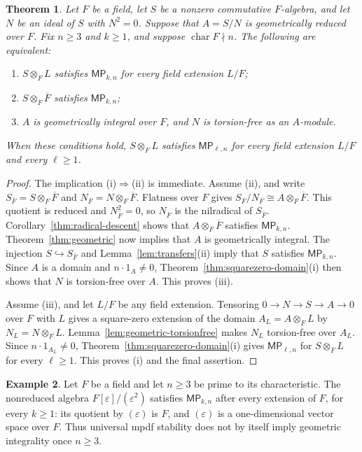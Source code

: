 \documentclass[11pt,a4paper]{amsart}
\newtheorem{theorem}{Theorem}[section]
\theoremstyle{definition}
\newtheorem{example}[theorem]{Example}
\theoremstyle{remark}
\newcommand{\MP}[2]{\mathsf{MP}_{#1,#2}}
\numberwithin{equation}{section}
\begin{document}
\begin{theorem}\label{thm:geometric-squarezero}
Let $F$ be a field, let $S$ be a nonzero commutative $F$-algebra, and
let $N$ be an ideal of $S$ with $N^2=0$. Suppose that $A=S/N$ is
geometrically reduced over $F$. Fix $n\ge3$ and $k\ge1$, and suppose
$\operatorname{char}F\nmid n$. The following are equivalent:
\begin{enumerate}
\item $S\otimes_F L$ satisfies $\MP{k}{n}$ for every field extension
$L/F$;
\item $S\otimes_F\overline F$ satisfies $\MP{k}{n}$;
\item $A$ is geometrically integral over $F$, and $N$ is torsion-free
as an $A$-module.
\end{enumerate}
When these conditions hold, $S\otimes_F L$ satisfies
$\MP{\ell}{n}$ for every field extension $L/F$ and every $\ell\ge1$.
\end{theorem}
\begin{proof}
The implication (i)$\Rightarrow$(ii) is immediate. Assume (ii), and
write $S_{\overline F}=S\otimes_F\overline F$ and
$N_{\overline F}=N\otimes_F\overline F$. Flatness over $F$ gives
$S_{\overline F}/N_{\overline F}\cong A\otimes_F\overline F$.
This quotient is reduced and $N_{\overline F}^2=0$, so
$N_{\overline F}$ is the nilradical of $S_{\overline F}$.
Corollary~\ref{thm:radical-descent} shows that
$A\otimes_F\overline F$ satisfies $\MP{k}{n}$.
Theorem~\ref{thm:geometric} now implies that $A$ is geometrically
integral. The injection $S\hookrightarrow S_{\overline F}$ and
Lemma~\ref{lem:transfers}(ii) imply that $S$ satisfies $\MP{k}{n}$.
Since $A$ is a domain and $n\cdot1_A\ne0$, Theorem~\ref{thm:squarezero-domain}(i)
then shows that $N$ is torsion-free over $A$. This proves (iii).

Assume (iii), and let $L/F$ be any field extension. Tensoring
$0\to N\to S\to A\to0$ over $F$ with $L$ gives a square-zero
extension of the domain $A_L=A\otimes_F L$ by
$N_L=N\otimes_F L$. Lemma~\ref{lem:geometric-torsionfree} makes
$N_L$ torsion-free over $A_L$. Since $n\cdot1_{A_L}\ne0$,
Theorem~\ref{thm:squarezero-domain}(i) gives $\MP{\ell}{n}$ for
$S\otimes_F L$ for every $\ell\ge1$. This proves (i) and the final
assertion.
\end{proof}

\begin{example}
Let $F$ be a field and let $n\ge3$ be prime to its characteristic.
The nonreduced algebra $F[\varepsilon]/(\varepsilon^2)$ satisfies
$\MP{k}{n}$ after every extension of $F$, for every $k\ge1$:
its quotient by $(\varepsilon)$ is $F$, and $(\varepsilon)$ is a
one-dimensional vector space over $F$. Thus universal mpdf stability
does not by itself imply geometric integrality once $n\ge3$.
\end{example}
\end{document}
